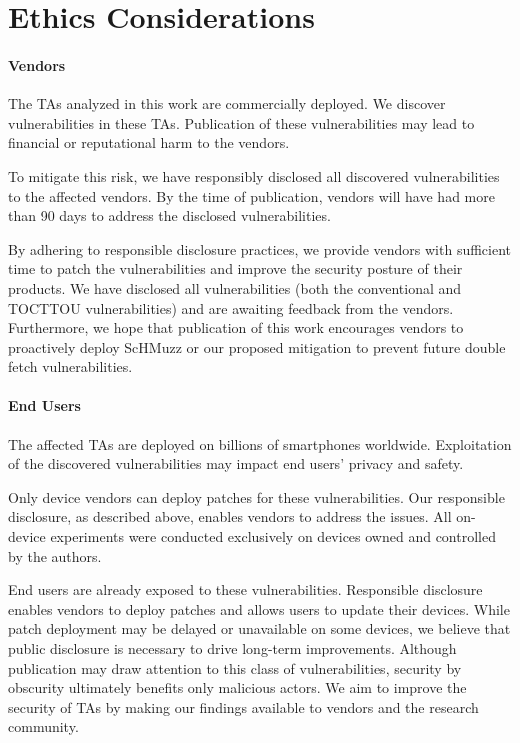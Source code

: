 \documentclass[conference]{IEEEtran}
\newcommand{\sysname}{ScHMuzz\xspace}
\begin{document}
\section*{Ethics Considerations}\label{sec:trash}

\paragraph{Vendors} The TAs analyzed in this work are commercially
deployed. We discover vulnerabilities in these TAs. Publication of these
vulnerabilities may lead to financial or reputational harm to the vendors.

To mitigate this risk, we have responsibly disclosed all
discovered vulnerabilities to the affected vendors. By the time of publication,
vendors will have had more than 90 days to address the disclosed vulnerabilities.

By adhering to responsible disclosure practices, we provide
vendors with sufficient time to patch the vulnerabilities and improve the
security posture of their products. We have disclosed all vulnerabilities (both 
the conventional and TOCTTOU vulnerabilities) 
and are awaiting feedback from the vendors. Furthermore, we hope
that publication of this work encourages vendors to proactively deploy \sysname
or our proposed mitigation to prevent future double fetch vulnerabilities.

\paragraph{End Users}
The affected TAs are deployed on billions of smartphones worldwide.
Exploitation of the discovered vulnerabilities may impact end users' privacy
and safety.

Only device vendors can deploy patches for these
vulnerabilities. Our responsible disclosure, as described above, enables vendors
to address the issues. All on-device experiments were conducted
exclusively on devices owned and controlled by the authors.

End users are already exposed to these vulnerabilities.
Responsible disclosure enables vendors to deploy patches and allows users to
update their devices. While patch deployment may be delayed or unavailable on
some devices, we believe that public disclosure is necessary to drive long-term
improvements. Although publication may draw attention to
this class of vulnerabilities, security by obscurity ultimately benefits only
malicious actors. We aim to improve the security of TAs by making our findings
available to vendors and the research community.
\end{document}
